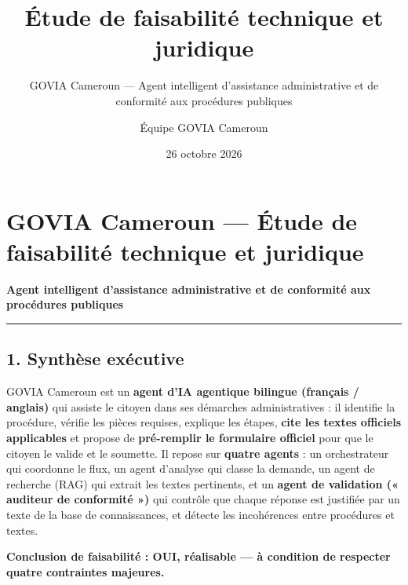 \documentclass[
]{article}
\title{Étude de faisabilité technique et juridique}
\subtitle{GOVIA Cameroun --- Agent intelligent d'assistance
administrative et de conformité aux procédures publiques}
\author{Équipe GOVIA Cameroun}
\date{26 octobre 2026}
\begin{document}
\maketitle

\section{GOVIA Cameroun --- Étude de faisabilité technique et
juridique}\label{govia-cameroun-uxe9tude-de-faisabilituxe9-technique-et-juridique}

\textbf{Agent intelligent d'assistance administrative et de conformité
aux procédures publiques}

\begin{center}\rule{0.5\linewidth}{0.5pt}\end{center}

\subsection{1. Synthèse exécutive}\label{synthuxe8se-exuxe9cutive}

GOVIA Cameroun est un \textbf{agent d'IA agentique bilingue (français /
anglais)} qui assiste le citoyen dans ses démarches administratives : il
identifie la procédure, vérifie les pièces requises, explique les
étapes, \textbf{cite les textes officiels applicables} et propose de
\textbf{pré-remplir le formulaire officiel} pour que le citoyen le
valide et le soumette. Il repose sur \textbf{quatre agents} : un
orchestrateur qui coordonne le flux, un agent d'analyse qui classe la
demande, un agent de recherche (RAG) qui extrait les textes pertinents,
et un \textbf{agent de validation (« auditeur de conformité »)} qui
contrôle que chaque réponse est justifiée par un texte de la base de
connaissances, et détecte les incohérences entre procédures et textes.

\textbf{Conclusion de faisabilité : OUI, réalisable --- à condition de
respecter quatre contraintes majeures.}
\end{document}

